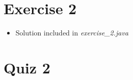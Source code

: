 \documentclass[12pt]{article}
\begin{document}
\bigskip

\section{Exercise 2}

\bigskip

\begin{itemize}
    \item Solution included in \textit{exercise\_2.java}
\end{itemize}

\bigskip

\section{Quiz 2}

\bigskip
\end{document}
